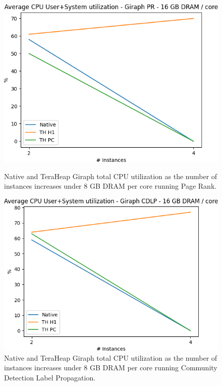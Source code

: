 \begin{figure}[thbp]
        \centering
        \includegraphics[width=\linewidth]{./fig/G_PR_128_UTIL.png}
    \caption{Native and TeraHeap Giraph total CPU utilization
        as the number of instances increases under 8 GB DRAM per core running Page Rank.}
                \label{fig:g_pr_128_util}

        \includegraphics[width=\linewidth]{./fig/G_CDLP_128_UTIL.png}
    \caption{Native and TeraHeap Giraph total CPU utilization
        as the number of instances increases under 8 GB DRAM per core running Community Detection Label Propagation.}
                \label{fig:g_cdlp_128_util}
\end{figure}

